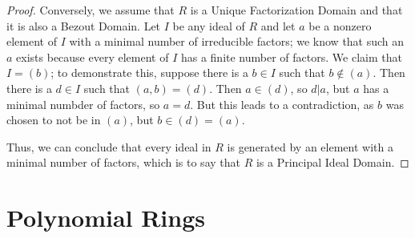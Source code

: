 \documentclass{report}
\begin{document}
\begin{enumerate}
\begin{proof}
	   \noindent
	   Conversely, we assume that $R$ is a Unique Factorization Domain and that it is also a Bezout Domain.
	   Let $I$ be any ideal of $R$ and let $a$ be a nonzero element of $I$ with a minimal number of irreducible factors;
	   we know that such an $a$ exists because every element of $I$ has a finite number of factors.
	   We claim that $I=(b)$; to demonstrate this, suppose there is a $b\in I$ such that $b\notin (a)$. Then there is a $d\in I$ such that $(a,b)=(d)$.
	   Then $a\in (d)$, so $d|a$, but $a$ has a minimal numbder of factors, so $a=d$.
	   But this leads to a contradiction, as $b$ was chosen to not be in $(a)$, but $b\in(d)=(a)$.
	   \bigskip

	   \noindent
	   Thus, we can conclude that every ideal in $R$ is generated by an element with a minimal number of factors,
	   which is to say that $R$ is a Principal Ideal Domain.
	\end{proof}
		
\end{enumerate}

\chapter{Polynomial Rings}
\end{document}
